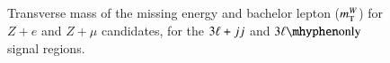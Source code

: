 \begin{figure}[htb]
{  }
  \caption{Transverse mass of the missing energy and bachelor lepton ($m_{\mathrm{T}}^W$) for $Z+e$ and $Z+\mu$ candidates, for the $3\ell+jj$ and $\threelo$ signal regions.}
  \label{fig:SR-mTW-2}
\end{figure}

\clearpage

